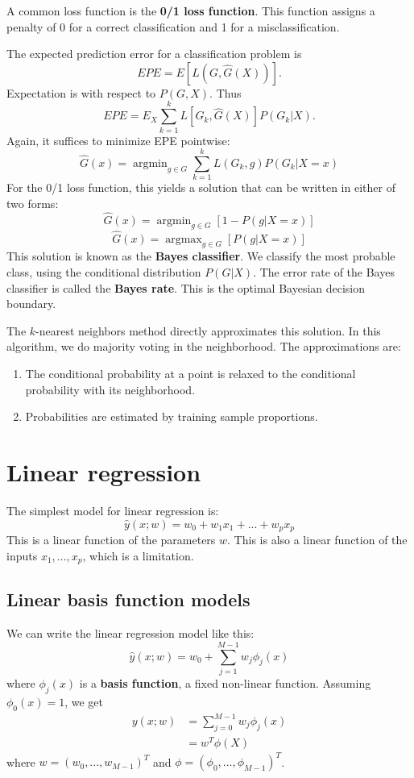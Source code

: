 \documentclass[a4paper,12pt]{article}
\DeclareMathOperator*{\argmin}{argmin}
\DeclareMathOperator*{\argmax}{argmax}
\begin{document}
A common loss function is the \textbf{0/1 loss function}. This function assigns a penalty of 0 for a correct classification and 1 for a misclassification. 

The expected prediction error for a classification problem is 
$$EPE = E\left[L(G, \hat G(X))\right].$$ 
Expectation is with respect to $P(G,X)$. Thus
$$EPE = E_X \sum_{k=1}^k L\left[G_k, \hat G(X)\right]P(G_k|X).$$
Again, it suffices to minimize EPE pointwise: 
$$\hat G(x) = \argmin_{g\in G} \sum^k_{k=1} L(G_k, g)P(G_k|X=x)$$
For the 0/1 loss function, this yields a solution that can be written in either of two forms: 
$$\hat G(x) = \argmin_{g\in G} \left[1- P(g|X=x)\right]$$
$$\hat G(x) = \argmax_{g\in G} \left[P(g|X=x)\right]$$
This solution is known as the \textbf{Bayes classifier}. We classify the most probable class, using the conditional distribution $P(G|X)$. The error rate of the Bayes classifier is called the \textbf{Bayes rate}. This is the optimal Bayesian decision boundary. 

The $k$-nearest neighbors method directly approximates this solution. In this algorithm, we do majority voting in the neighborhood. The approximations are: 
\begin{enumerate}
\item The conditional probability at a point is relaxed to the conditional probability with its neighborhood. 
\item Probabilities are estimated by training sample proportions. 
\end{enumerate}


\clearpage

\section{Linear regression}

The simplest model for linear regression is: 
$$\hat y(x; w) = w_0 + w_1x_1+...+w_px_p$$
This is a linear function of the parameters $w$. This is also a linear function of the inputs $x_1, ..., x_p$, which is a limitation. 

\subsection{Linear basis function models}

We can write the linear regression model like this: 
$$\hat y(x; w) = w_0 + \sum_{j=1}^{M-1} w_j \phi_j(x)$$
where $\phi_j(x)$ is a \textbf{basis function}, a fixed non-linear function. Assuming $\phi_0(x) = 1$, we get
\begin{align*}
y(x; w) &= \sum_{j=0}^{M-1} w_j \phi_j(x)\\
 		&= w^T\phi(X)
\end{align*}
where $w = (w_0, ..., w_{M-1})^T$ and $\phi = (\phi_0, ..., \phi_{M-1})^T$. 
\end{document}
